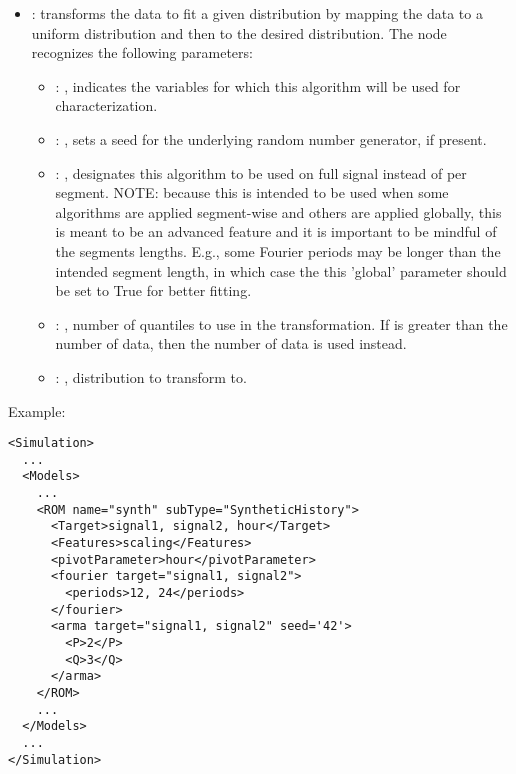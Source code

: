 \begin{itemize}
    \item {}:
      transforms the data to fit a given distribution by mapping the data to     a uniform
      distribution and then to the desired distribution.
      The  node recognizes the following parameters:
        \begin{itemize}
          \item {}: ,
            indicates the variables for which this algorithm will be used for characterization.
          \item {}: ,
            sets a seed for the underlying random number generator, if present.
          \item {}: ,
            designates this algorithm to be used on full signal instead of per
            segment. NOTE: because this is intended to be used when some algorithms are
            applied segment-wise and others are applied globally, this is meant to be an
            advanced feature and it is important to be mindful of the segments lengths.
            E.g., some Fourier periods may be longer than the intended segment length, in
            which case the this 'global' parameter should be set to True for better
            fitting. 
          \item {}: ,
            number of quantiles to use in the transformation. If 
            is greater than the number of data, then the number of data is used instead. 
          \item {}: ,
            distribution to transform to. 
      \end{itemize}
  \end{itemize}

\hspace{24pt}
Example:
\begin{lstlisting}[style=XML,morekeywords={name,subType,pivotLength,shift,target,threshold,period,width}]
<Simulation>
  ...
  <Models>
    ...
    <ROM name="synth" subType="SyntheticHistory">
      <Target>signal1, signal2, hour</Target>
      <Features>scaling</Features>
      <pivotParameter>hour</pivotParameter>
      <fourier target="signal1, signal2">
        <periods>12, 24</periods>
      </fourier>
      <arma target="signal1, signal2" seed='42'>
        <P>2</P>
        <Q>3</Q>
      </arma>
    </ROM>
    ...
  </Models>
  ...
</Simulation>
\end{lstlisting}



